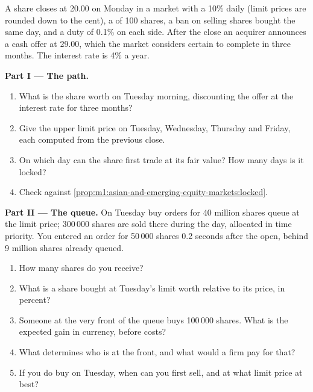 \begin{problem}\label{pb:m1:asian-and-emerging-equity-markets:1}
A share closes at 20.00 on Monday in a market with a 10\% daily 
(limit prices are rounded down to the cent), a  of 100 shares, a ban
on selling shares bought the same day, and a duty of 0.1\% on each side. After
the close an acquirer announces a cash offer at 29.00, which the market
considers certain to complete in three months. The interest rate is 4\% a
year.

\medskip\noindent\textbf{Part I --- The path.}
\begin{enumerate}
\item What is the share worth on Tuesday morning, discounting the offer at
the interest rate for three months?
\item Give the upper limit price on Tuesday, Wednesday, Thursday and Friday,
each computed from the previous close.
\item On which day can the share first trade at its fair value? How many days
is it locked?
\item Check against \cref{prop:m1:asian-and-emerging-equity-markets:locked}.
\end{enumerate}

\medskip\noindent\textbf{Part II --- The queue.}
On Tuesday buy orders for 40 million shares queue at the limit price; 300\,000
shares are sold there during the day, allocated in time priority. You entered
an order for 50\,000 shares 0.2 seconds after the open, behind 9 million
shares already queued.
\begin{enumerate}[resume]
\item How many shares do you receive?
\item What is a share bought at Tuesday's limit worth relative to its price,
in percent?
\item Someone at the very front of the queue buys 100\,000 shares. What is
the expected gain in currency, before costs?
\item What determines who is at the front, and what would a firm pay for
that?
\item If you do buy on Tuesday, when can you first sell, and at what limit
price at best?
\end{enumerate}


\end{problem}
